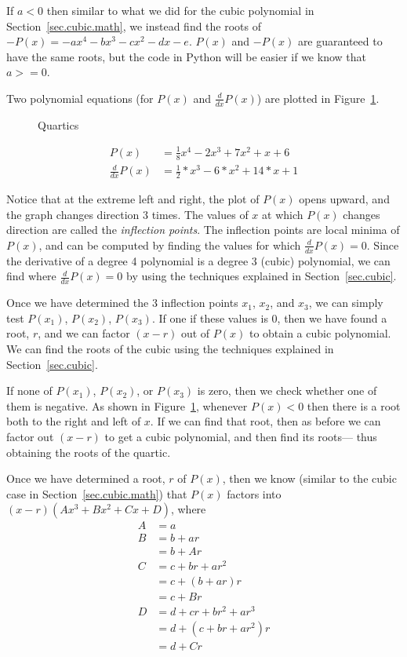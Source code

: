 If $a<0$ then similar to what we did for the cubic polynomial in Section~\ref{sec.cubic.math}, we instead find the
roots of $-P(x) = -a x^4 - b x^3 - c x^2 - d x - e$.  $P(x)$ and $-P(x)$ are guaranteed to have the same roots,
but the code in Python will be easier if we know that $a >= 0$.


Two polynomial equations (for $P(x)$ and $\frac{d}{dx} P(x)$) are plotted in Figure~\ref{fig.quartic}.

\begin{figure}
\centering

\caption{Quartics}
\label{fig.quartic}
\end{figure}

\begin{align*}
  P(x) &= \frac{1}{8}  x^4 -2 x^3 + 7  x^2 + x + 6\\
  \frac{d}{dx} P(x) &= \frac{1}{2} * x^3 -6* x^2 + 14 * x + 1
\end{align*}

Notice that at the extreme left and right, the plot of $P(x)$ opens
upward, and the graph changes direction 3 times.  The values of $x$ at
which $P(x)$ changes direction are called the \emph{inflection
points}.  The inflection points are local minima of $P(x)$, and can
be computed by finding the values for which $\frac{d}{dx} P(x) = 0$.
Since the derivative of a degree 4 polynomial is a degree 3 (cubic)
polynomial, we can find where $\frac{d}{dx} P(x) = 0$ by using the
techniques explained in Section~\ref{sec.cubic}.

Once we have determined the 3 inflection points $x_1$, $x_2$, and $x_3$, we can
simply test $P(x_1)$, $P(x_2)$, $P(x_3)$.  If one if these values is 0, then
we have found a root, $r$, and we can factor $(x-r)$ out of $P(x)$ to obtain
a cubic polynomial.  We can find the roots of the cubic using the techniques
explained in Section~\ref{sec.cubic}.

If none of $P(x_1)$, $P(x_2)$, or $P(x_3)$ is zero, then we check
whether one of them is negative.  As shown in
Figure~\ref{fig.quartic}, whenever $P(x)<0$ then there is a root both
to the right and left of $x$.  If we can find that root, then as before
we can factor out $(x-r)$ to get a cubic polynomial, and then find its roots---
thus obtaining the roots of the quartic.

Once we have determined a root, $r$ of $P(x)$, then we know (similar to the cubic case in Section~\ref{sec.cubic.math})
that $P(x)$ factors into $(x-r)(Ax^3 + Bx^2 + Cx + D)$, where
\begin{align}
  A &= a\label{eq.7.A}\\
  B &= b + a r\nonumber\\
   &= b + A r\label{eq.7.B}\\
  C &= c + b r + a r^2\nonumber\\
  &= c + (b + a r)r\nonumber\\
  &= c + B r\label{eq.7.C}\\
  D &= d + c r + b r^2 + a r^3\nonumber\\
  &= d + ( c + b r + a r^2)r\nonumber\\
  &= d + C r\label{eq.7.D}
\end{align}


